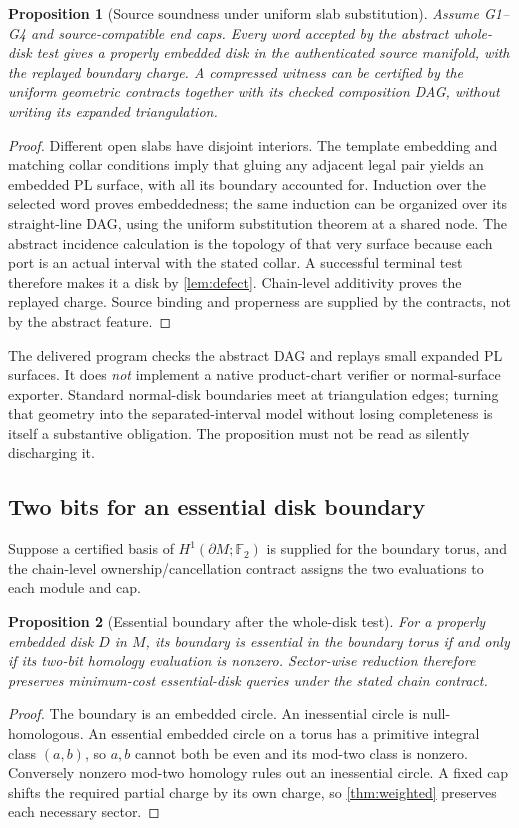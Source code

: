 \documentclass[11pt,a4paper]{article}
\newtheorem{proposition}[proposition]{Proposition}
\theoremstyle{definition}
\newcommand{\F}{\mathbb F_2}
\begin{document}
\begin{proposition}[Source soundness under uniform slab substitution]\label{prop:slab}
Assume G1--G4 and source-compatible end caps. Every word accepted by the abstract whole-disk test gives a properly embedded disk in the authenticated source manifold, with the replayed boundary charge. A compressed witness can be certified by the uniform geometric contracts together with its checked composition DAG, without writing its expanded triangulation.
\end{proposition}
\begin{proof}
Different open slabs have disjoint interiors. The template embedding and matching collar conditions imply that gluing any adjacent legal pair yields an embedded PL surface, with all its boundary accounted for. Induction over the selected word proves embeddedness; the same induction can be organized over its straight-line DAG, using the uniform substitution theorem at a shared node. The abstract incidence calculation is the topology of that very surface because each port is an actual interval with the stated collar. A successful terminal test therefore makes it a disk by \cref{lem:defect}. Chain-level additivity proves the replayed charge. Source binding and properness are supplied by the contracts, not by the abstract feature.
\end{proof}

The delivered program checks the abstract DAG and replays small expanded PL surfaces. It does \emph{not} implement a native product-chart verifier or normal-surface exporter. Standard normal-disk boundaries meet at triangulation edges; turning that geometry into the separated-interval model without losing completeness is itself a substantive obligation. The proposition must not be read as silently discharging it.

\subsection{Two bits for an essential disk boundary}
Suppose a certified basis of $H^1(\partial M;\F)$ is supplied for the boundary torus, and the chain-level ownership/cancellation contract assigns the two evaluations to each module and cap.

\begin{proposition}[Essential boundary after the whole-disk test]\label{prop:essential}
For a properly embedded disk $D$ in $M$, its boundary is essential in the boundary torus if and only if its two-bit homology evaluation is nonzero. Sector-wise reduction therefore preserves minimum-cost essential-disk queries under the stated chain contract.
\end{proposition}
\begin{proof}
The boundary is an embedded circle. An inessential circle is null-homologous. An essential embedded circle on a torus has a primitive integral class $(a,b)$, so $a,b$ cannot both be even and its mod-two class is nonzero. Conversely nonzero mod-two homology rules out an inessential circle. A fixed cap shifts the required partial charge by its own charge, so \cref{thm:weighted} preserves each necessary sector.
\end{proof}
\end{document}

